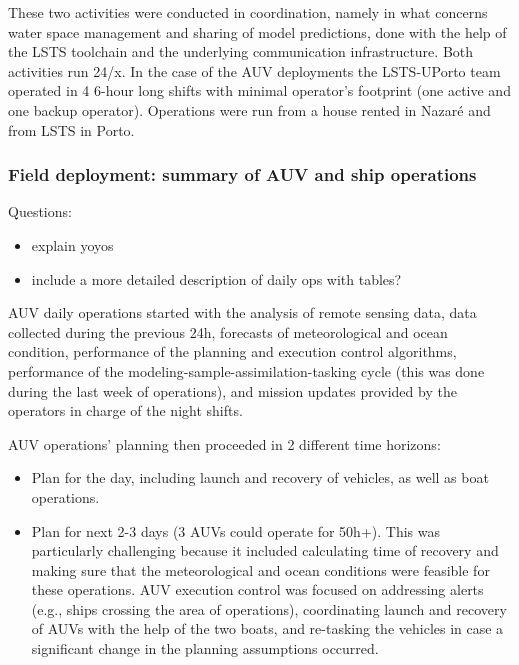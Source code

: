 These two activities were conducted in coordination, namely in what
concerns water space management and sharing of model predictions, done
with the help of the LSTS toolchain and the underlying communication
infrastructure. Both activities run 24/x. In the case of the AUV
deployments the LSTS-UPorto team operated in 4 6-hour long shifts with
minimal operator’s footprint (one active and one backup operator).
Operations were run from a house rented in Nazaré and from LSTS in
Porto.


\subsubsection{Field deployment: summary of AUV and ship operations}

Questions:
\begin{itemize}
    \item explain yoyos
    \item include a more detailed description of daily ops with tables?
\end{itemize}


AUV daily operations started with the analysis of remote sensing data,
data collected during the previous 24h, forecasts of meteorological and
ocean condition, performance of the planning and execution control
algorithms, performance of the modeling-sample-assimilation-tasking
cycle (this was done during the last week of operations), and mission
updates provided by the operators in charge of the night shifts.

AUV operations’ planning then proceeded in 2 different time horizons:

\begin{itemize}

\item Plan for the day, including launch and recovery of
  vehicles, as well as boat operations. 

\item Plan for next 2-3 days (3 AUVs could operate for 50h+). This was
  particularly challenging
  because it included calculating time of recovery and making sure that
  the meteorological and ocean conditions were feasible for these
  operations. AUV execution control was focused on addressing alerts
  (e.g., ships crossing the area of operations), coordinating launch and
  recovery of AUVs with the help of the two boats, and re-tasking the
  vehicles in case a significant change in the planning assumptions
  occurred. 

\end{itemize}

